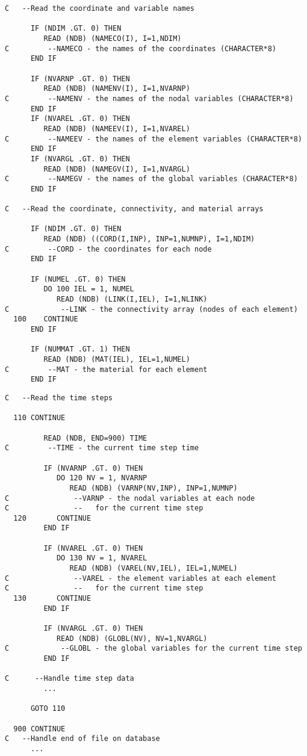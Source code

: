 \begin{verbatim}
C   --Read the coordinate and variable names

      IF (NDIM .GT. 0) THEN
         READ (NDB) (NAMECO(I), I=1,NDIM)
C         --NAMECO - the names of the coordinates (CHARACTER*8)
      END IF

      IF (NVARNP .GT. 0) THEN
         READ (NDB) (NAMENV(I), I=1,NVARNP)
C         --NAMENV - the names of the nodal variables (CHARACTER*8)
      END IF
      IF (NVAREL .GT. 0) THEN
         READ (NDB) (NAMEEV(I), I=1,NVAREL)
C         --NAMEEV - the names of the element variables (CHARACTER*8)
      END IF
      IF (NVARGL .GT. 0) THEN
         READ (NDB) (NAMEGV(I), I=1,NVARGL)
C         --NAMEGV - the names of the global variables (CHARACTER*8)
      END IF

C   --Read the coordinate, connectivity, and material arrays

      IF (NDIM .GT. 0) THEN
         READ (NDB) ((CORD(I,INP), INP=1,NUMNP), I=1,NDIM)
C         --CORD - the coordinates for each node
      END IF

      IF (NUMEL .GT. 0) THEN
         DO 100 IEL = 1, NUMEL
            READ (NDB) (LINK(I,IEL), I=1,NLINK)
C            --LINK - the connectivity array (nodes of each element)
  100    CONTINUE
      END IF

      IF (NUMMAT .GT. 1) THEN
         READ (NDB) (MAT(IEL), IEL=1,NUMEL)
C         --MAT - the material for each element
      END IF
\end{verbatim}
\newpage
\begin{verbatim}
C   --Read the time steps

  110 CONTINUE

         READ (NDB, END=900) TIME
C         --TIME - the current time step time

         IF (NVARNP .GT. 0) THEN
            DO 120 NV = 1, NVARNP
               READ (NDB) (VARNP(NV,INP), INP=1,NUMNP)
C               --VARNP - the nodal variables at each node
C               --   for the current time step
  120       CONTINUE
         END IF

         IF (NVAREL .GT. 0) THEN
            DO 130 NV = 1, NVAREL
               READ (NDB) (VAREL(NV,IEL), IEL=1,NUMEL)
C               --VAREL - the element variables at each element
C               --   for the current time step
  130       CONTINUE
         END IF

         IF (NVARGL .GT. 0) THEN
            READ (NDB) (GLOBL(NV), NV=1,NVARGL)
C            --GLOBL - the global variables for the current time step
         END IF

C      --Handle time step data
         ...

      GOTO 110

  900 CONTINUE
C   --Handle end of file on database
      ...
\end{verbatim}
